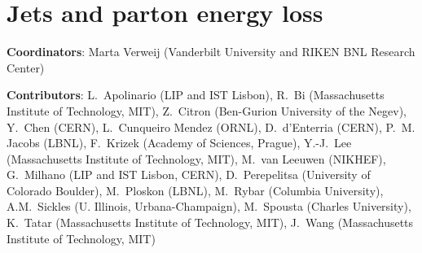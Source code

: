\documentclass[../report.tex]{subfiles}
\providecommand{\main}{..}
\begin{document}
\section{Jets and parton energy loss}\label{sec:HI_Jets}

{ \small
  \noindent \textbf{Coordinators}: Marta Verweij (Vanderbilt University and RIKEN BNL Research Center)
  
  \noindent \textbf{Contributors}:
L.~Apolinario (LIP and IST Lisbon),
R.~Bi (Massachusetts Institute of Technology, MIT),
Z.~Citron (Ben-Gurion University of the Negev),
Y.~Chen (CERN),
L.~Cunqueiro Mendez (ORNL),
D.~d'Enterria (CERN),
P.~M. Jacobs (LBNL),
F.~Krizek (Academy of Sciences, Prague),
Y.-J.~Lee (Massachusetts Institute of Technology, MIT),
M.~van Leeuwen (NIKHEF),
G.~Milhano (LIP and IST Lisbon, CERN),
D.~Perepelitsa (University of Colorado Boulder),
M.~Ploskon (LBNL),
M.~Rybar (Columbia University),
A.M.~Sickles (U. Illinois, Urbana-Champaign),
M.~Spousta (Charles University),
K.~Tatar (Massachusetts Institute of Technology, MIT),
J.~Wang  (Massachusetts Institute of Technology, MIT)
}



\newpage

\newpage

\newpage

%
\end{document}

